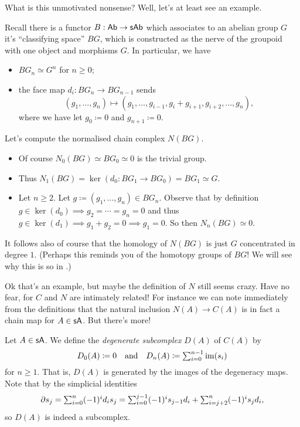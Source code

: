 What is this unmotivated nonsense? Well, let's at least see an example.

\begin{example}
  \label{BG}
  Recall there is a functor $B : \mathsf{Ab} \to \mathsf{s}\mathsf{Ab}$ which associates to an
  abelian group $G$ it's ``classifying space'' $BG$, which is
  constructed as the nerve of the groupoid with one object and
  morphisms $G$. In particular, we have
  \begin{itemize}
  \item $BG_n \simeq G^n$ for $n \ge 0$;
  \item the face map $d_i : BG_n \to BG_{n-1}$ sends
    \[
    (g_1,\ldots,g_n) \mapsto (g_1,\ldots,g_{i-1}, g_i + g_{i+1},
    g_{i+2}, \ldots, g_n),
    \]
    where we have let $g_0 \coloneqq 0$ and $g_{n+1} \coloneqq 0$.
  \end{itemize}
  Let's compute the normalised chain complex $N(BG)$.
  \begin{itemize}
  \item Of course $N_0(BG) \simeq BG_0 \simeq 0$ is the trivial group.
  \item Thus $N_1(BG) = \ker(d_0 : BG_1 \to BG_0) = BG_1 \simeq G$.
  \item Let $n \ge 2$. Let $g \coloneqq (g_1, \ldots, g_n) \in
    BG_n$. Observe that by definition $g \in \ker(d_0) \implies g_2 =
    \cdots = g_n = 0$ and thus $g \in \ker(d_1) \implies g_1 + g_2 = 0
    \implies g_1 = 0$. So then $N_n(BG) \simeq 0$.
  \end{itemize}
  It follows also of course that the homology of $N(BG)$ is just $G$
  concentrated in degree $1$. (Perhaps this reminds you of the
  homotopy groups of $BG$! We will see why this is so in .)
\end{example}

Ok that's an example, but maybe the definition of $N$ still seems
crazy. Have no fear, for $C$ and $N$ are intimately related! For
instance we can note immediately from the definitions that the natural
inclusion $N(A) \to C(A)$ is in fact a chain map for $A \in \mathsf{s}\mathsf{A}$. But
there's more!

\begin{definition}
  Let $A \in \mathsf{s}\mathsf{A}$. We define the \textit{degenerate subcomplex}
  $D(A)$ of $C(A)$ by
  \[
  \textstyle{D_0(A) \coloneqq 0 \quad\text{and}\quad D_n(A) \coloneqq
    \sum_{i=0}^{n-1} \operatorname{im}(s_i)}
  \]
  for $n \ge 1$. That is, $D(A)$ is generated by the images of
  the degeneracy maps. Note that by the simplicial identities
  \[
  \textstyle{\partial s_j = \sum_{i=0}^n (-1)^i d_i s_j = \sum_{i=0}^{j-1}
    (-1)^i s_{j-1} d_i + \sum_{i=j+2}^n (-1)^i s_j d_i,}
  \]
  so $D(A)$ is indeed a subcomplex.
\end{definition}

